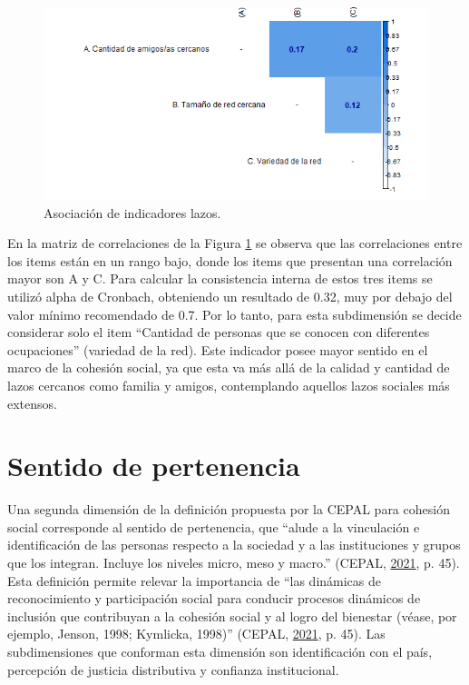 \documentclass[
  12pt,
]{book}
\begin{document}
\begin{figure}[H]

{\centering \includegraphics[width=1\linewidth,height=1\textheight]{output/graphs/lazos_cor} 

}

\caption{Asociación de indicadores lazos.}\label{fig:lazos-cor}
\end{figure}

En la matriz de correlaciones de la Figura \ref{fig:lazos-cor} se observa que las correlaciones entre los items están en un rango bajo, donde los items que presentan una correlación mayor son A y C. Para calcular la consistencia interna de estos tres items se utilizó alpha de Cronbach, obteniendo un resultado de 0.32, muy por debajo del valor mínimo recomendado de 0.7. Por lo tanto, para esta subdimensión se decide considerar solo el item ``Cantidad de personas que se conocen con diferentes ocupaciones'' (variedad de la red). Este indicador posee mayor sentido en el marco de la cohesión social, ya que esta va más allá de la calidad y cantidad de lazos cercanos como familia y amigos, contemplando aquellos lazos sociales más extensos.

\hypertarget{sentido-de-pertenencia}{%
\section{Sentido de pertenencia}\label{sentido-de-pertenencia}}

Una segunda dimensión de la definición propuesta por la CEPAL para cohesión social corresponde al sentido de pertenencia, que ``alude a la vinculación e identificación de las personas respecto a la sociedad y a las instituciones y grupos que los integran. Incluye los niveles micro, meso y macro.'' (CEPAL, \protect\hyperlink{ref-cepal_cohesion_2021}{2021}, p. 45). Esta definición permite relevar la importancia de ``las dinámicas de reconocimiento y participación social para conducir procesos dinámicos de inclusión que contribuyan a la cohesión social y al logro del bienestar (véase, por ejemplo, Jenson, 1998; Kymlicka, 1998)'' (CEPAL, \protect\hyperlink{ref-cepal_cohesion_2021}{2021}, p. 45). Las subdimensiones que conforman esta dimensión son identificación con el país, percepción de justicia distributiva y confianza institucional.
\end{document}
